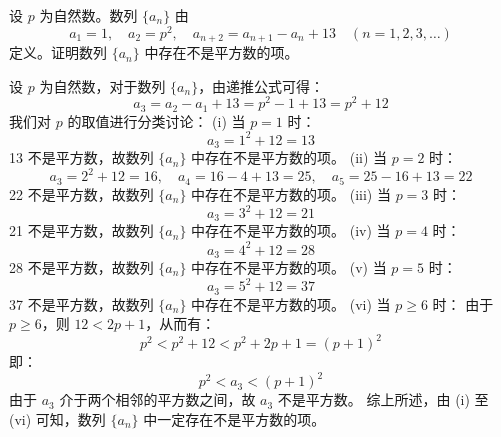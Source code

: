 \begin{questions}

\question 
设 $p$ 为自然数。数列 $\{a_n\}$ 由
\[
a_1 = 1, \quad a_2 = p^2, \quad a_{n+2} = a_{n+1} - a_n + 13 \quad (n = 1, 2, 3, \dots)
\]
定义。证明数列 $\{a_n\}$ 中存在不是平方数的项。

\begin{solution}
    设 $p$ 为自然数，对于数列 $\{a_n\}$，由递推公式可得：
    \[
    a_3 = a_2 - a_1 + 13 = p^2 - 1 + 13 = p^2 + 12
    \]
    我们对 $p$ 的取值进行分类讨论：
    (i) 当 $p = 1$ 时：
    \[
    a_3 = 1^2 + 12 = 13
    \]
    13 不是平方数，故数列 $\{a_n\}$ 中存在不是平方数的项。
    (ii) 当 $p = 2$ 时：
    \[
    a_3 = 2^2 + 12 = 16, \quad a_4 = 16 - 4 + 13 = 25, \quad a_5 = 25 - 16 + 13 = 22
    \]
    22 不是平方数，故数列 $\{a_n\}$ 中存在不是平方数的项。
    (iii) 当 $p = 3$ 时：
    \[
    a_3 = 3^2 + 12 = 21
    \]
    21 不是平方数，故数列 $\{a_n\}$ 中存在不是平方数的项。
    (iv) 当 $p = 4$ 时：
    \[
    a_3 = 4^2 + 12 = 28
    \]
    28 不是平方数，故数列 $\{a_n\}$ 中存在不是平方数的项。
    (v) 当 $p = 5$ 时：
    \[
    a_3 = 5^2 + 12 = 37
    \]
    37 不是平方数，故数列 $\{a_n\}$ 中存在不是平方数的项。
    (vi) 当 $p \ge 6$ 时：
    由于 $p \ge 6$，则 $12 < 2p + 1$，从而有：
    \[
    p^2 < p^2 + 12 < p^2 + 2p + 1 = (p+1)^2
    \]
    即：
    \[
    p^2 < a_3 < (p+1)^2
    \]
    由于 $a_3$ 介于两个相邻的平方数之间，故 $a_3$ 不是平方数。
    综上所述，由 (i) 至 (vi) 可知，数列 $\{a_n\}$ 中一定存在不是平方数的项。
\end{solution}


\end{questions}
